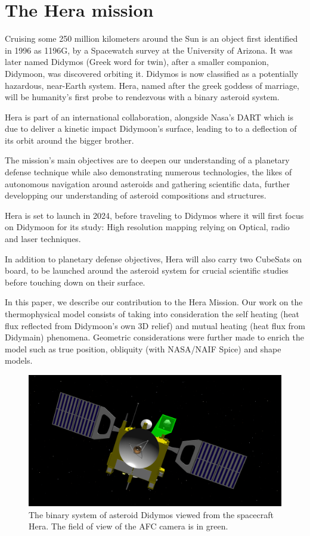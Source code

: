 \section{The Hera mission}
\label{intro}
Cruising some 250 million kilometers around the Sun is an object first identified in 1996 as 1196G, by a Spacewatch survey at the  University of Arizona. It was later named Didymos (Greek word for twin), after a smaller companion, Didymoon, was discovered orbiting it. Didymos is now classified  as a potentially hazardous, near-Earth system. 
Hera, named after the greek goddess of marriage, will be humanity's first probe to rendezvous with a binary asteroid system. 

Hera is part of an international collaboration, alongside Nasa's DART which is due to deliver a kinetic impact Didymoon's surface, leading to to a deflection of its orbit around the bigger brother.  

The mission's main objectives are to deepen our understanding of a planetary defense technique while also demonstrating numerous technologies, the likes of autonomous navigation around asteroids and gathering scientific data, further developping our understanding of asteroid compositions and structures. 

Hera is set to launch in 2024, before traveling to Didymos where it will first focus on Didymoon for its study: High resolution mapping relying on Optical, radio and laser techniques. 

In addition to planetary defense objectives, Hera will also carry two CubeSats on board, to be launched around the asteroid system for crucial scientific studies before touching down on their surface. 

In this paper, we describe our contribution to the Hera Mission. Our work on the thermophysical model consists of taking into consideration the self heating (heat flux reflected from Didymoon's own 3D relief) and mutual heating (heat flux from Didymain) phenomena. Geometric considerations were further made to enrich the model such as true position, obliquity (with NASA/NAIF Spice) and shape models.  

\begin{figure}
    \includegraphics[width=\linewidth]{rsc/hera_didymos.png}
    \caption{The binary system of asteroid Didymos viewed from the spacecraft Hera. The field of view of the AFC camera is in green.}
    \label{fig:1.1}
\end{figure}

